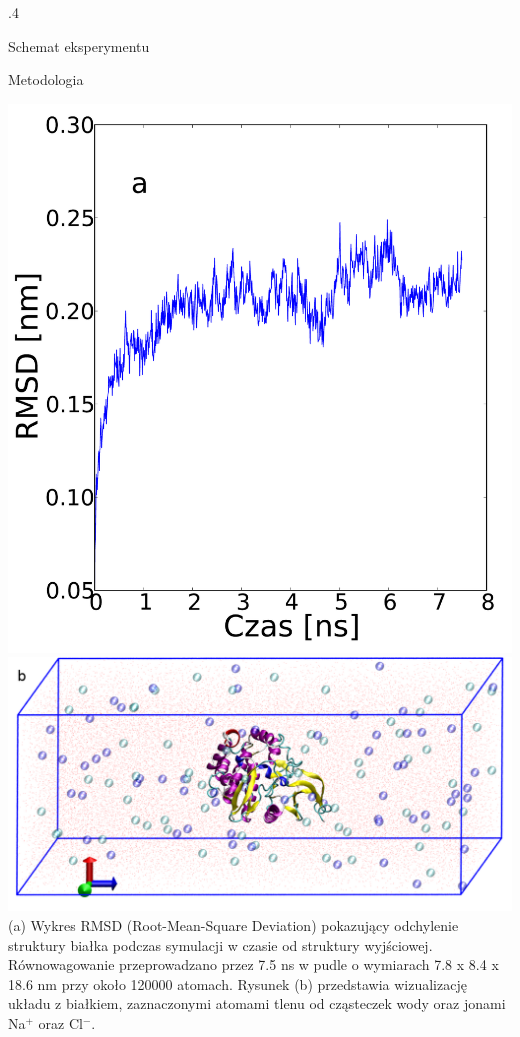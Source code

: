 \documentclass[final, t]{beamer} %
\begin{document}
\begin{frame}{}
\begin{columns}[T]
\begin{column} {.4\textwidth}
\begin{block}{Schemat eksperymentu}
        \end{block}
        \begin{block}{Metodologia}
        \centering
         \begin{minipage}{0.97\textwidth}
       \includegraphics[width=0.32\linewidth]{rmsd.pdf}
        \includegraphics[width=0.66\linewidth]{plot.png}\\
       (a) Wykres RMSD (Root-Mean-Square Deviation) pokazujący odchylenie struktury białka podczas symulacji w czasie od struktury wyjściowej. Równowagowanie przeprowadzano przez 7.5 ns w pudle o wymiarach 7.8 x 8.4 x 18.6 nm przy około 120000 atomach. Rysunek (b) przedstawia wizualizację układu z białkiem, zaznaczonymi atomami tlenu od cząsteczek wody oraz jonami Na$^{+}$ oraz Cl$^{-}$.
        \end{minipage}
        \end{block}
       

\end{column}
\end{columns}
\end{frame}
\end{document}
